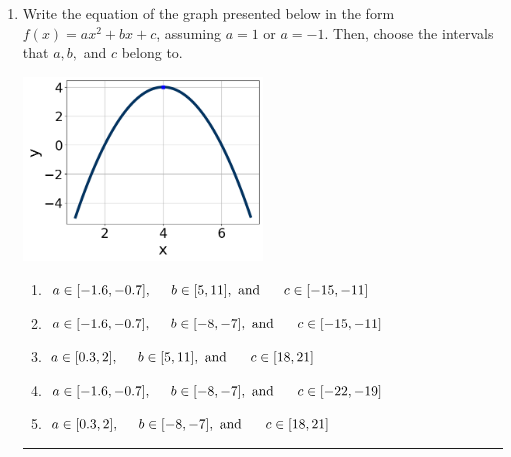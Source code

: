\documentclass[14pt]{extbook}
\newcommand{\litem}[1]{\item#1\hspace*{-1cm}\rule{\textwidth}{0.4pt}}
\begin{document}
\begin{enumerate}
{\begin{enumerate}[label=\Alph*.]
\end{enumerate} }
\litem{
Write the equation of the graph presented below in the form $f(x)=ax^2+bx+c$, assuming  $a=1$ or $a=-1$. Then, choose the intervals that $a, b,$ and $c$ belong to.
\begin{center}
    \includegraphics[width=0.5\textwidth]{../Figures/quadraticGraphToEquationCopyC.png}
\end{center}
\begin{enumerate}[label=\Alph*.]
\item \( a \in [-1.6, -0.7], \hspace*{5mm} b \in [5, 11], \text{ and } \hspace*{5mm} c \in [-15, -11] \)
\item \( a \in [-1.6, -0.7], \hspace*{5mm} b \in [-8, -7], \text{ and } \hspace*{5mm} c \in [-15, -11] \)
\item \( a \in [0.3, 2], \hspace*{5mm} b \in [5, 11], \text{ and } \hspace*{5mm} c \in [18, 21] \)
\item \( a \in [-1.6, -0.7], \hspace*{5mm} b \in [-8, -7], \text{ and } \hspace*{5mm} c \in [-22, -19] \)
\item \( a \in [0.3, 2], \hspace*{5mm} b \in [-8, -7], \text{ and } \hspace*{5mm} c \in [18, 21] \)

\end{enumerate} }
\end{enumerate}
\end{document}
